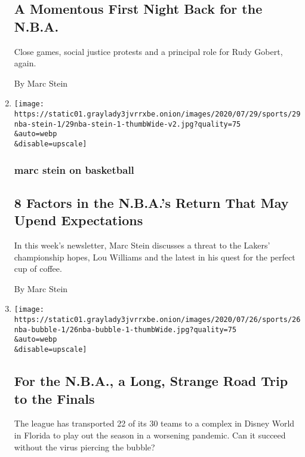 \begin{enumerate}
{  \subsection{A Momentous First Night Back for the
  N.B.A.}\label{a-momentous-first-night-back-for-the-nba}}

  Close games, social justice protests and a principal role for Rudy
  Gobert, again.

  By Marc Stein
\item
  \href{/2020/07/29/sports/basketball/nba-restart-lou-williams.html}{}

  \texttt{[image: https://static01.graylady3jvrrxbe.onion/images/2020/07/29/sports/29nba-stein-1/29nba-stein-1-thumbWide-v2.jpg?quality=75\\\&auto=webp\\\&disable=upscale]}

  \hypertarget{marc-stein-on-basketball}{%
  \subsubsection{marc stein on
  basketball}\label{marc-stein-on-basketball}}

  \hypertarget{8-factors-in-the-nbas-return-that-may-upend-expectations}{%
  \subsection{8 Factors in the N.B.A.'s Return That May Upend
  Expectations}\label{8-factors-in-the-nbas-return-that-may-upend-expectations}}

  In this week's newsletter, Marc Stein discusses a threat to the
  Lakers' championship hopes, Lou Williams and the latest in his quest
  for the perfect cup of coffee.

  By Marc Stein
\item
  \href{/2020/07/27/sports/basketball/coronavirus-nba-season-bubble-disney-world.html}{}

  \texttt{[image: https://static01.graylady3jvrrxbe.onion/images/2020/07/26/sports/26nba-bubble-1/26nba-bubble-1-thumbWide.jpg?quality=75\\\&auto=webp\\\&disable=upscale]}

  \hypertarget{for-the-nba-a-long-strange-road-trip-to-the-finals}{%
  \subsection{For the N.B.A., a Long, Strange Road Trip to the
  Finals}\label{for-the-nba-a-long-strange-road-trip-to-the-finals}}

  The league has transported 22 of its 30 teams to a complex in Disney
  World in Florida to play out the season in a worsening pandemic. Can
  it succeed without the virus piercing the bubble?


\end{enumerate}
